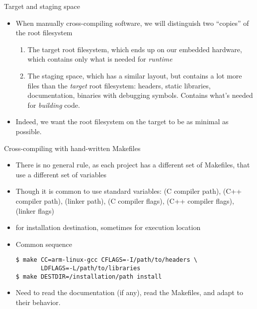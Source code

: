 \begin{frame}{Target and staging space}
  \begin{itemize}
  \item When manually cross-compiling software, we will distinguish
    two ``copies'' of the root filesystem
    \begin{enumerate}
    \item The target root filesystem, which ends up on our embedded
      hardware, which contains only what is needed for {\em runtime}
    \item The staging space, which has a similar layout, but contains
      a lot more files than the {\em target} root filesystem: headers,
      static libraries, documentation, binaries with debugging
      symbols. Contains what's needed for {\em building} code.
    \end{enumerate}
  \item Indeed, we want the root filesystem on the target to be as
    minimal as possible.
  \end{itemize}
\end{frame}

\begin{frame}[fragile]{Cross-compiling with hand-written Makefiles}
  \begin{itemize}
  \item There is no general rule, as each project has a different
    set of Makefiles, that use a different set of variables
  \item Though it is common to use  standard variables:
     (C compiler path),  (C++ compiler path),
     (linker path),  (C compiler flags),
     (C++ compiler flags),  (linker
    flags)
  \item {} for installation destination, sometimes
     for execution location
  \item Common sequence
    \begin{block}{}
      {
        \begin{verbatim}
$ make CC=arm-linux-gcc CFLAGS=-I/path/to/headers \
       LDFLAGS=-L/path/to/libraries
$ make DESTDIR=/installation/path install
        \end{verbatim}
      }
    \end{block}
  \item Need to read the documentation (if any), read the Makefiles,
    and adapt to their behavior.
  \end{itemize}
\end{frame}

